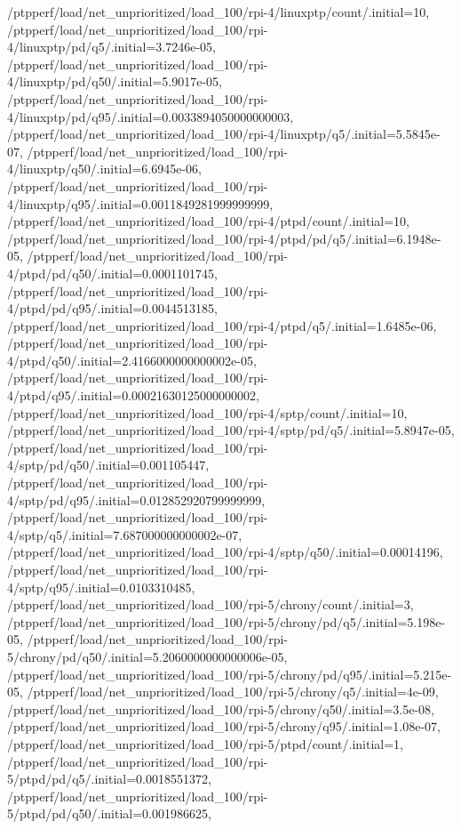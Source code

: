 {    /ptpperf/load/net_unprioritized/load_100/rpi-4/linuxptp/count/.initial=10,
    /ptpperf/load/net_unprioritized/load_100/rpi-4/linuxptp/pd/q5/.initial=3.7246e-05,
    /ptpperf/load/net_unprioritized/load_100/rpi-4/linuxptp/pd/q50/.initial=5.9017e-05,
    /ptpperf/load/net_unprioritized/load_100/rpi-4/linuxptp/pd/q95/.initial=0.0033894050000000003,
    /ptpperf/load/net_unprioritized/load_100/rpi-4/linuxptp/q5/.initial=5.5845e-07,
    /ptpperf/load/net_unprioritized/load_100/rpi-4/linuxptp/q50/.initial=6.6945e-06,
    /ptpperf/load/net_unprioritized/load_100/rpi-4/linuxptp/q95/.initial=0.0011849281999999999,
    /ptpperf/load/net_unprioritized/load_100/rpi-4/ptpd/count/.initial=10,
    /ptpperf/load/net_unprioritized/load_100/rpi-4/ptpd/pd/q5/.initial=6.1948e-05,
    /ptpperf/load/net_unprioritized/load_100/rpi-4/ptpd/pd/q50/.initial=0.0001101745,
    /ptpperf/load/net_unprioritized/load_100/rpi-4/ptpd/pd/q95/.initial=0.0044513185,
    /ptpperf/load/net_unprioritized/load_100/rpi-4/ptpd/q5/.initial=1.6485e-06,
    /ptpperf/load/net_unprioritized/load_100/rpi-4/ptpd/q50/.initial=2.4166000000000002e-05,
    /ptpperf/load/net_unprioritized/load_100/rpi-4/ptpd/q95/.initial=0.00021630125000000002,
    /ptpperf/load/net_unprioritized/load_100/rpi-4/sptp/count/.initial=10,
    /ptpperf/load/net_unprioritized/load_100/rpi-4/sptp/pd/q5/.initial=5.8947e-05,
    /ptpperf/load/net_unprioritized/load_100/rpi-4/sptp/pd/q50/.initial=0.001105447,
    /ptpperf/load/net_unprioritized/load_100/rpi-4/sptp/pd/q95/.initial=0.012852920799999999,
    /ptpperf/load/net_unprioritized/load_100/rpi-4/sptp/q5/.initial=7.687000000000002e-07,
    /ptpperf/load/net_unprioritized/load_100/rpi-4/sptp/q50/.initial=0.00014196,
    /ptpperf/load/net_unprioritized/load_100/rpi-4/sptp/q95/.initial=0.0103310485,
    /ptpperf/load/net_unprioritized/load_100/rpi-5/chrony/count/.initial=3,
    /ptpperf/load/net_unprioritized/load_100/rpi-5/chrony/pd/q5/.initial=5.198e-05,
    /ptpperf/load/net_unprioritized/load_100/rpi-5/chrony/pd/q50/.initial=5.2060000000000006e-05,
    /ptpperf/load/net_unprioritized/load_100/rpi-5/chrony/pd/q95/.initial=5.215e-05,
    /ptpperf/load/net_unprioritized/load_100/rpi-5/chrony/q5/.initial=4e-09,
    /ptpperf/load/net_unprioritized/load_100/rpi-5/chrony/q50/.initial=3.5e-08,
    /ptpperf/load/net_unprioritized/load_100/rpi-5/chrony/q95/.initial=1.08e-07,
    /ptpperf/load/net_unprioritized/load_100/rpi-5/ptpd/count/.initial=1,
    /ptpperf/load/net_unprioritized/load_100/rpi-5/ptpd/pd/q5/.initial=0.0018551372,
    /ptpperf/load/net_unprioritized/load_100/rpi-5/ptpd/pd/q50/.initial=0.001986625,
}

